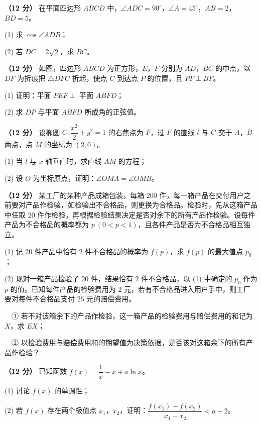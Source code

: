 \begin{question}
\textbf{（12 分）} 在平面四边形 $ABCD$ 中，$\angle ADC=90^\circ$，$\angle A=45^\circ$，$AB=2$，$BD=5$。

  (1) 求 $\cos\angle ADB$；

  (2) 若 $DC=2\sqrt2$，求 $BC$。

\Needspace{0.4\textheight}
\end{question}
\begin{question}
\textbf{（12 分）} 如图，四边形 $ABCD$ 为正方形，$E$，$F$ 分别为 $AD$，$BC$ 的中点，以 $DF$ 为折痕把 $\triangle DFC$ 折起，使点 $C$ 到达点 $P$ 的位置，且 $PF\perp BF$。
\nopagebreak[4]
\begin{center}\end{center}
\nopagebreak[4]
  (1) 证明：平面 $PEF\perp$ 平面 $ABFD$；

  (2) 求 $DP$ 与平面 $ABFD$ 所成角的正弦值。

\end{question}
\begin{question}
\textbf{（12 分）} 设椭圆 $C:\dfrac{x^{2}}2+y^{2}=1$ 的右焦点为 $F$，过 $F$ 的直线 $l$ 与 $C$ 交于 $A$，$B$ 两点，点 $M$ 的坐标为 $(2,0)$。

  (1) 当 $l$ 与 $x$ 轴垂直时，求直线 $AM$ 的方程；

  (2) 设 $O$ 为坐标原点，证明：$\angle OMA=\angle OMB$。

\end{question}
\begin{question}
\textbf{（12 分）} 某工厂的某种产品成箱包装，每箱 $200$ 件，每一箱产品在交付用户之前要对产品作检验，如检验出不合格品，则更换为合格品。检验时，先从这箱产品中任取 $20$ 件作检验，再根据检验结果决定是否对余下的所有产品作检验。设每件产品为不合格品的概率都为 $p\ (0<p<1)$，且各件产品是否为不合格品相互独立。

  (1) 记 $20$ 件产品中恰有 $2$ 件不合格品的概率为 $f(p)$，求 $f(p)$ 的最大值点 $p_0$；

  (2) 现对一箱产品检验了 $20$ 件，结果恰有 $2$ 件不合格品，以 (1) 中确定的 $p_0$ 作为 $p$ 的值。已知每件产品的检验费用为 $2$ 元，若有不合格品进入用户手中，则工厂要对每件不合格品支付 $25$ 元的赔偿费用。

  　① 若不对该箱余下的产品作检验，这一箱产品的检验费用与赔偿费用的和记为 $X$，求 $EX$；

  　② 以检验费用与赔偿费用和的期望值为决策依据，是否该对这箱余下的所有产品作检验？

\end{question}
\begin{question}
\textbf{（12 分）} 已知函数 $f(x)=\dfrac1x-x+a\ln x$。

  (1) 讨论 $f(x)$ 的单调性；

  (2) 若 $f(x)$ 存在两个极值点 $x_1$，$x_2$，证明：$\dfrac{f\left(x_1\right)-f\left(x_2\right)}{x_1-x_2}<a-2$。

\par\medskip

\end{question}

